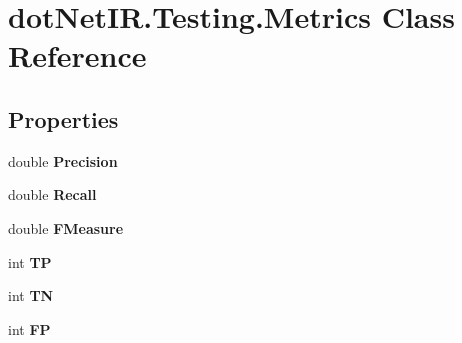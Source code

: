 \hypertarget{classdot_net_i_r_1_1_testing_1_1_metrics}{}\section{dot\+Net\+I\+R.\+Testing.\+Metrics Class Reference}
\label{classdot_net_i_r_1_1_testing_1_1_metrics}
\subsection*{Properties}
\begin{DoxyCompactItemize}
\item 
\hypertarget{classdot_net_i_r_1_1_testing_1_1_metrics_addf96f24c0b655addf6683ec52284ec3}{}\label{classdot_net_i_r_1_1_testing_1_1_metrics_addf96f24c0b655addf6683ec52284ec3} 
double {\bfseries Precision}
\item 
\hypertarget{classdot_net_i_r_1_1_testing_1_1_metrics_a6b0c17197e2521b3669d2e8683fde534}{}\label{classdot_net_i_r_1_1_testing_1_1_metrics_a6b0c17197e2521b3669d2e8683fde534} 
double {\bfseries Recall}
\item 
\hypertarget{classdot_net_i_r_1_1_testing_1_1_metrics_ae45813fad531d97c5dcd88d5ab4579be}{}\label{classdot_net_i_r_1_1_testing_1_1_metrics_ae45813fad531d97c5dcd88d5ab4579be} 
double {\bfseries F\+Measure}
\item 
\hypertarget{classdot_net_i_r_1_1_testing_1_1_metrics_afeafaf2f1743a8567cca01d3a1297bc9}{}\label{classdot_net_i_r_1_1_testing_1_1_metrics_afeafaf2f1743a8567cca01d3a1297bc9} 
int {\bfseries TP}
\item 
\hypertarget{classdot_net_i_r_1_1_testing_1_1_metrics_af1346b48ba08484af486e9e099a14124}{}\label{classdot_net_i_r_1_1_testing_1_1_metrics_af1346b48ba08484af486e9e099a14124} 
int {\bfseries TN}
\item 
\hypertarget{classdot_net_i_r_1_1_testing_1_1_metrics_a93eb738ebca76b9e5a6cb104d0caa976}{}\label{classdot_net_i_r_1_1_testing_1_1_metrics_a93eb738ebca76b9e5a6cb104d0caa976} 
int {\bfseries FP}

\end{DoxyCompactItemize}
